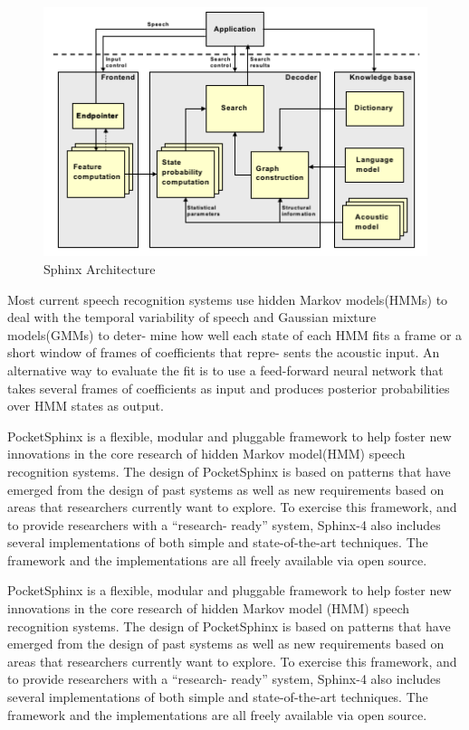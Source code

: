 \documentclass[12pt,a4paper,oneside]{memoir}
\begin{document}
\begin{figure}[h]
    \centering
    \includegraphics[scale=1.0]{sphinx4_architecture}
    \caption{Sphinx Architecture}
\end{figure}


Most current speech recognition systems use hidden Markov models(HMMs) to deal with the temporal variability of speech and Gaussian mixture models(GMMs) to deter- mine how well each state of each HMM fits a frame or a short window of frames of coefficients that repre- sents the acoustic input. An alternative way to evaluate the fit is to use a feed-forward neural network that takes several frames of coefficients as input and produces posterior probabilities over HMM states as output.

PocketSphinx is a flexible, modular and pluggable framework to help foster new innovations in the core research of hidden Markov model(HMM) speech recognition systems. The design of PocketSphinx is based on patterns that have emerged from the design of past systems as well as new requirements based on areas that researchers currently want to explore. To exercise this framework, and to provide researchers with a “research- ready” system, Sphinx-4 also includes several implementations of both simple and state-of-the-art techniques. The framework and the implementations are all freely available via open source.

PocketSphinx is a flexible, modular and pluggable framework to help foster new innovations in the core research of hidden Markov model (HMM) speech recognition systems. The design of PocketSphinx is based on patterns that have emerged from the design of past systems as well as new requirements based on areas that researchers currently want to explore. To exercise this framework, and to provide researchers with a “research- ready” system, Sphinx-4 also includes several implementations of both simple and state-of-the-art techniques. The framework and the implementations are all freely available via open source.
\end{document}
